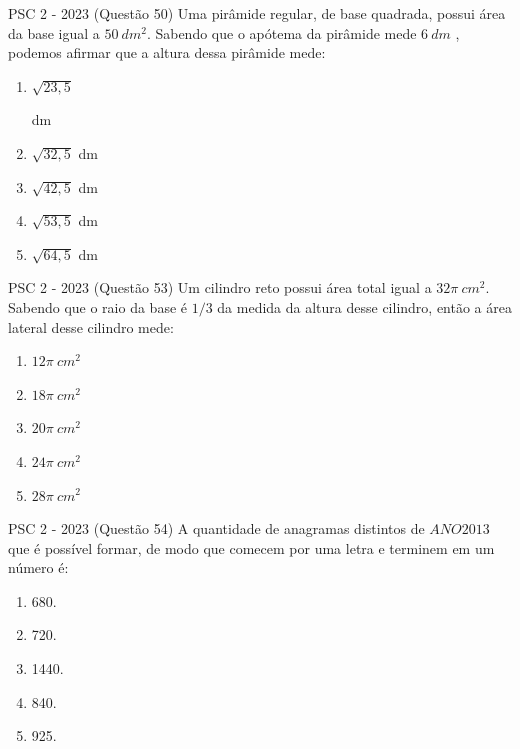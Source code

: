 \documentclass[aspectratio=169]{beamer}
\newif\ifusarcorvermelha
\newcommand{\vermelho}[1]{%
    \ifusarcorvermelha
        {\color{red}#1}%
    \else
        #1%
    \fi
}
\begin{document}
    \begin{frame}{PSC 2 - 2023 (Questão 50)}
       Uma pirâmide regular, de base quadrada, possui área da base igual a $50 \ dm^{2}$. Sabendo que o apótema da pirâmide mede $6 \ dm$ , podemos afirmar que a altura dessa pirâmide mede:


         \begin{enumerate}[a]
                    \item \vermelho{$\sqrt{23,5}$} dm %
                    \item $\sqrt{32,5}$ dm
                    \item $\sqrt{42,5}$ dm
                    \item $\sqrt{53,5}$ dm
                    \item $\sqrt{64,5}$ dm
                \end{enumerate}        
    \end{frame}

    \begin{frame}{PSC 2 - 2023 (Questão 53)}
      Um cilindro reto possui área total igual a $32\pi \ cm^{2}$. Sabendo que o raio da base é ${1}/{3}$ da medida da altura desse cilindro, então a área lateral desse cilindro mede:
       
         \begin{enumerate}[a]
                    \item $12\pi \ cm^{2}$
                    \item $18\pi \ cm^{2}$
                    \item $20\pi \ cm^{2}$
                    \item \vermelho{$24\pi \ cm^{2}$} %
                    \item $28\pi \ cm^{2}$

                \end{enumerate}        
    \end{frame}

    \begin{frame}{PSC 2 - 2023 (Questão 54)}
        A quantidade de anagramas distintos de $ANO2013$ que é possível formar, de modo que comecem por uma letra e terminem em um número é:
       
         \begin{enumerate}[a]
            \item 680.
            \item 720.
            \item \vermelho{1440.}
            \item 840.
            \item 925.

        \end{enumerate}        
    \end{frame}
\end{document}
